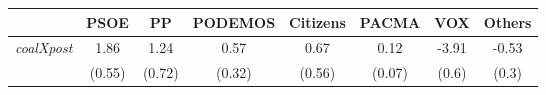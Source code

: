 \begin{table}[ht]
\centering
\begin{tabular}{lccccccc}
\hline
\hline
& PSOE & PP & PODEMOS & Citizens & PACMA & VOX & Others \\
\hline
\textit{coalXpost} & 1.86 & 1.24 & 0.57 & 0.67 & 0.12 & -3.91 & -0.53 \\
\textit{} & (0.55) & (0.72) & (0.32) & (0.56) & (0.07) & (0.6) & (0.3) \\
\hline
\hline
\end{tabular}
\end{table}